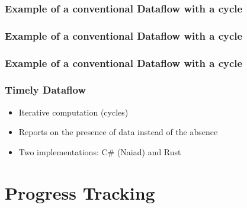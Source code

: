 \documentclass[aspectratio=169,10pt]{beamer}
\begin{document}
\begin{frame}
  \frametitle{Example of a conventional Dataflow with a cycle}
  \begin{center}
    
  \end{center}
\end{frame}

\begin{frame}
  \frametitle{Example of a conventional Dataflow with a cycle}
  \begin{center}
    
  \end{center}
\end{frame}

\begin{frame}
  \frametitle{Example of a conventional Dataflow with a cycle}
  \begin{center}
    
  \end{center}
\end{frame}

\begin{frame}
  \frametitle{Timely Dataflow}
  \begin{figure}
  \end{figure}
  \pause
  \begin{itemize}
    \item Iterative computation (cycles)
          \pause
    \item Reports on the presence of data instead of the absence
          \pause
    \item Two implementations: C\# (Naiad) and Rust
  \end{itemize}
\end{frame}

\section{Progress Tracking}
\end{document}
